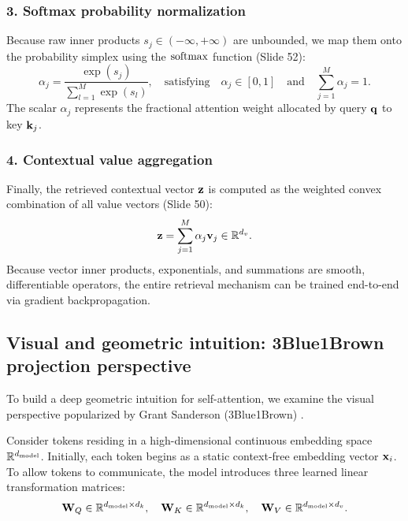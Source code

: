 \documentclass[../../../main.tex]{subfiles}
\begin{document}
\subsubsection{3. Softmax probability normalization}
Because raw inner products $s_j \in (-\infty, +\infty)$ are unbounded, we map them onto the probability simplex using the $\operatorname{\mathrm{softmax}}$ function (Slide 52):
\begin{equation}
\label{eq:softmax_weight_def}
\alpha_j = \frac{\exp(s_j)}{\sum_{l=1}^M \exp(s_l)}, \quad \text{satisfying} \quad \alpha_j \in [0, 1] \quad \text{and} \quad \sum_{j=1}^M \alpha_j = 1.
\end{equation}
The scalar $\alpha_j$ represents the fractional attention weight allocated by query $\mathbf{q}$ to key $\mathbf{k}_j$.

\subsubsection{4. Contextual value aggregation}
Finally, the retrieved contextual vector $\mathbf{z}$ is computed as the weighted convex combination of all value vectors (Slide 50):
\begin{equation}
\label{eq:convex_combination_values}
\mathbf{z} = \sum_{j=1}^M \alpha_j \mathbf{v}_j \in \mathbb{R}^{d_v}.
\end{equation}
Because vector inner products, exponentials, and summations are smooth, differentiable operators, the entire retrieval mechanism can be trained end-to-end via gradient backpropagation.

\subsection{Visual and geometric intuition: 3Blue1Brown projection perspective}
\label{subsec:3b1b_geometric_perspective}

To build a deep geometric intuition for self-attention, we examine the visual perspective popularized by Grant Sanderson (3Blue1Brown) \cite{sanderson2024attention}.

Consider tokens residing in a high-dimensional continuous embedding space $\mathbb{R}^{d_{\text{model}}}$. Initially, each token begins as a static context-free embedding vector $\mathbf{x}_i$. To allow tokens to communicate, the model introduces three learned linear transformation matrices:
\begin{equation}
\label{eq:learned_proj_matrices}
\mathbf{W}_Q \in \mathbb{R}^{d_{\text{model}} \times d_k}, \quad \mathbf{W}_K \in \mathbb{R}^{d_{\text{model}} \times d_k}, \quad \mathbf{W}_V \in \mathbb{R}^{d_{\text{model}} \times d_v}.
\end{equation}
\end{document}
